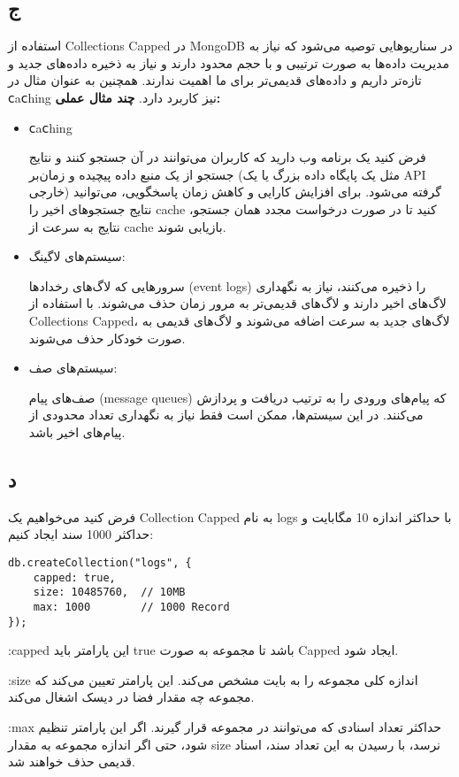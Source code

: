 \subsection*{ج}
استفاده از Collections Capped در MongoDB در سناریوهایی توصیه می‌شود که نیاز به مدیریت داده‌ها به صورت ترتیبی و با حجم محدود دارند و نیاز به ذخیره دادە‌های جدید و تازە‌تر داریم و دادە‌های قدیمی‌تر
برای ما اهمیت ندارند. همچنین به عنوان مثال در ⅽaⅽhing نیز کاربرد دارد.
\textbf{چند مثال عملی:}
\begin{itemize}
	\item ⅽaⅽhing
	
	فرض کنید یک برنامه وب دارید که کاربران می‌توانند در آن جستجو کنند و نتایج جستجو از یک منبع داده پیچیده و زمان‌بر (مثل یک پایگاه داده بزرگ یا یک API خارجی) گرفته می‌شود. برای افزایش کارایی و کاهش زمان پاسخگویی، می‌توانید نتایج جستجوهای اخیر را cache کنید تا در صورت درخواست مجدد همان جستجو، نتایج به سرعت از cache بازیابی شوند.
	\item سیستم‌های لاگینگ:

	سرورهایی که لاگ‌های رخدادها (event logs) را ذخیره می‌کنند، نیاز به نگهداری لاگ‌های اخیر دارند و لاگ‌های قدیمی‌تر به مرور زمان حذف می‌شوند. با استفاده از Collections Capped، لاگ‌های جدید به سرعت اضافه می‌شوند و لاگ‌های قدیمی به صورت خودکار حذف می‌شوند.
	\item سیستم‌های صف‌:
	
	صف‌های پیام (message queues) که پیام‌های ورودی را به ترتیب دریافت و پردازش می‌کنند. در این سیستم‌ها، ممکن است فقط نیاز به نگهداری تعداد محدودی از پیام‌های اخیر باشد.
		
\end{itemize}

\subsection*{د}

فرض کنید می‌خواهیم یک Collection Capped به نام logs با حداکثر اندازه 10 مگابایت و حداکثر 1000 سند ایجاد کنیم:
\setLTR
\begin{lstlisting}
db.createCollection("logs", {
	capped: true,
	size: 10485760,  // 10MB
	max: 1000        // 1000 Record
});
\end{lstlisting}
\setRTL

:capped
 این پارامتر باید true باشد تا مجموعه به صورت Capped ایجاد شود.

:size
 اندازه کلی مجموعه را به بایت مشخص می‌کند. این پارامتر تعیین می‌کند که مجموعه چه مقدار فضا در دیسک اشغال می‌کند.
 
 :max
 حداکثر تعداد اسنادی که می‌توانند در مجموعه قرار گیرند. اگر این پارامتر تنظیم شود، حتی اگر اندازه مجموعه به مقدار size نرسد، با رسیدن به این تعداد سند، اسناد قدیمی حذف خواهند شد.
 
